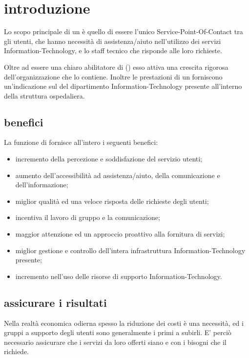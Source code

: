 %
%
\section[Introduzione]{introduzione}
\label{sd-introduction}
Lo scopo principale di un  è quello di essere l'unico \ac{Service-Point-Of-Contact} tra gli utenti, che hanno necessità di assistenza/aiuto nell'utilizzo dei servizi \acs{Information-Technology}, e lo staff tecnico che risponde alle loro richieste.

Oltre ad essere una chiaro abilitatore di  () esso attiva una crescita rigorosa dell'organizzazione che lo contiene. Inoltre le prestazioni di un  forniscono un'indicazione sul  del dipartimento \acs{Information-Technology} presente all'interno della struttura ospedaliera.

\subsection[Benefici]{benefici}
\label{sd-introduction-benefit}
La funzione di  fornisce all'intero \entity{} i seguenti benefici:

\begin{itemize}
\item{incremento della percezione e soddisfazione del servizio utenti;}
\item{aumento dell'accessibilità ad assistenza/aiuto, della comunicazione e dell'informazione;}
\item{miglior qualità ed una veloce risposta delle richieste degli utenti;}
\item{incentiva il lavoro di gruppo e la comunicazione;}
\item{maggior attenzione ed un approccio proattivo alla fornitura di servizi;}
\item{miglior gestione e controllo dell'intera infrastruttura \acs{Information-Technology} presente;}
\item{incremento nell'uso delle risorse di supporto \acs{Information-Technology}.}
\end{itemize}

\subsection[Assicurare i risultati]{assicurare i risultati}
\label{sd-introduction-ensuring-results}
Nella realtà economica odierna spesso la riduzione dei costi è una necessità, ed i gruppi a supporto degli utenti sono generalmente i primi a subirli. E' perciò necessario assicurare che i servizi da loro offerti siano  e  con i bisogni che il  richiede.

